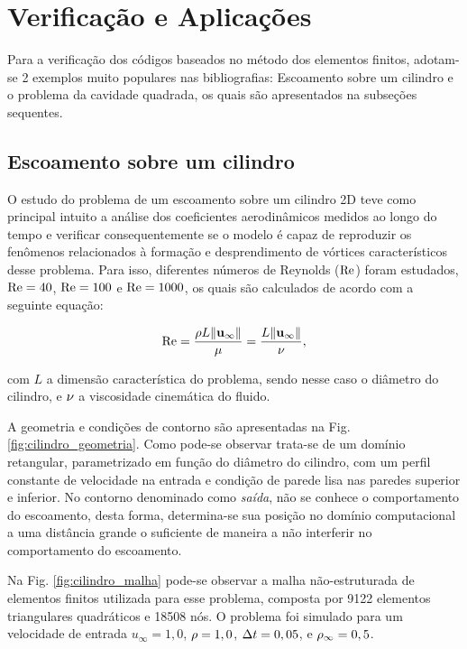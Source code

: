 \documentclass[tese_patricia]{subfiles}%
\begin{document}
\section{Verificação e Aplicações} \label{capitulo:Cap2:VerApl}

Para a verificação dos códigos baseados no método dos elementos finitos, adotam-se 2 exemplos muito populares nas bibliografias: Escoamento sobre um cilindro e o problema da cavidade quadrada, os quais são apresentados na subseções sequentes.

\subsection{Escoamento sobre um cilindro} \label{capitulo:Cap2:VerApl:Cilindo}

O estudo do problema de um escoamento sobre um cilindro 2D teve como principal intuito a análise dos coeficientes aerodinâmicos medidos ao longo do tempo e verificar consequentemente se o modelo é capaz de reproduzir os fenômenos relacionados à formação e desprendimento de vórtices característicos desse problema. Para isso, diferentes números de Reynolds ($\mathrm{Re}$) foram estudados, $\mathrm{Re} = 40$, $\mathrm{Re} = 100$ e $\mathrm{Re} = 1000$, os quais são calculados de acordo com a seguinte equação:

\begin{align}
	\mathrm{Re} = \frac{\rho L \lVert\mathbf{u}_{\infty}\lVert}{\mu} = \frac{L \lVert \mathbf{u}_{\infty} \lVert}{\nu}, \label{eq:Reynolds}
\end{align}

\noindent com $L$ a dimensão característica do problema, sendo nesse caso o diâmetro do cilindro, e $\nu$ a viscosidade cinemática do fluido. 

A geometria e condições de contorno são apresentadas na Fig. \ref{fig:cilindro_geometria}. Como pode-se observar trata-se de um domínio retangular, parametrizado em função do diâmetro do cilindro, com um perfil constante de velocidade na entrada e condição de parede lisa nas paredes superior e inferior. No contorno denominado como \textit{saída}, não se conhece o comportamento do escoamento, desta forma, determina-se sua posição no domínio computacional a uma distância grande o suficiente de maneira a não interferir no comportamento do escoamento. 

Na Fig. \ref{fig:cilindro_malha} pode-se observar a malha não-estruturada de elementos finitos utilizada para esse problema, composta por 9122 elementos triangulares quadráticos e 18508 nós. O problema foi simulado para um velocidade de entrada $u_{\infty} = 1,0$, $\rho = 1,0$, $\Delta t = 0,05$, e $\rho_\infty = 0,5$. 
\end{document}
